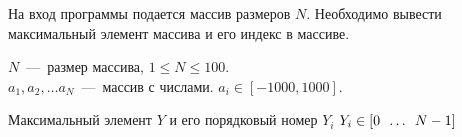 На вход программы подается массив размеров $N$. Необходимо вывести максимальный элемент массива и его индекс в массиве.

\InputFile

\noindent
$N$~---~размер массива, $1 \leq N \leq 100$. \\
$a_1, a_2, \ldots a_N$~---~массив с числами. $ a_i \in [-1000, 1000]$. 

\OutputFile

Максимальный элемент $Y$ и его порядковый номер $Y_i$
$Y_i \in [0 \enskip \ldots \enskip N - 1]$

\SAMPLES

